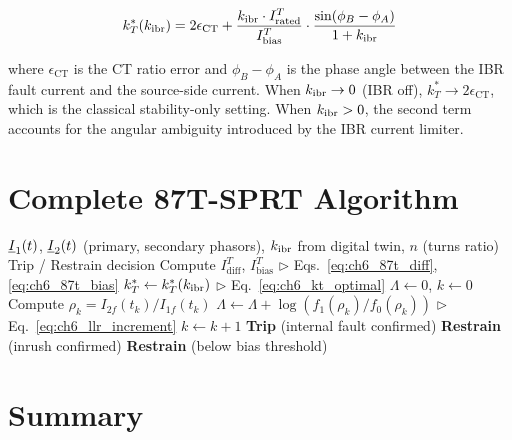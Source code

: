 \begin{equation}
  k_T^*(k_\mathrm{ibr}) = 2\epsilon_\mathrm{CT} +
    \frac{k_\mathrm{ibr} \cdot I_\mathrm{rated}^T}{I_\mathrm{bias}^T}
    \cdot \frac{\sin(\phi_B - \phi_A)}{1 + k_\mathrm{ibr}}
  \label{eq:ch6_kt_optimal}
\end{equation}

where $\epsilon_\mathrm{CT}$ is the CT ratio error and $\phi_B - \phi_A$
is the phase angle between the IBR fault current and the source-side current.
When $k_\mathrm{ibr} \to 0$ (IBR off), $k_T^* \to 2\epsilon_\mathrm{CT}$, which is
the classical stability-only setting. When $k_\mathrm{ibr} > 0$, the second term
accounts for the angular ambiguity introduced by the IBR current limiter.

\section{Complete 87T-SPRT Algorithm}
\label{sec:ch6_algorithm}

\begin{algorithm}[htbp]
\caption{87T-SPRT Adaptive Transformer Differential Protection}
\label{alg:ch6_87t_sprt}
\begin{algorithmic}[1]
\Require $\underline{I}_1(t)$, $\underline{I}_2(t)$ (primary, secondary phasors),
         $k_\mathrm{ibr}$ from digital twin, $n$ (turns ratio)
\Ensure Trip / Restrain decision
\State Compute $I_\mathrm{diff}^T$, $I_\mathrm{bias}^T$ \hfill $\triangleright$ Eqs.~\eqref{eq:ch6_87t_diff},\eqref{eq:ch6_87t_bias}
\State $k_T^* \gets k_T^*(k_\mathrm{ibr})$ \hfill $\triangleright$ Eq.~\eqref{eq:ch6_kt_optimal}
  \State $\Lambda \gets 0$,\; $k \gets 0$
    \State Compute $\rho_k = I_{2f}(t_k) / I_{1f}(t_k)$
    \State $\Lambda \gets \Lambda + \log(f_1(\rho_k)/f_0(\rho_k))$
    \hfill $\triangleright$ Eq.~\eqref{eq:ch6_llr_increment}
    \State $k \gets k + 1$
  \EndWhile
    \State \Return \textbf{Trip} (internal fault confirmed)
  \Else
    \State \Return \textbf{Restrain} (inrush confirmed)
  \EndIf
\Else
  \State \Return \textbf{Restrain} (below bias threshold)
\EndIf
\end{algorithmic}
\end{algorithm}

\section{Summary}
\label{sec:ch6_summary}


